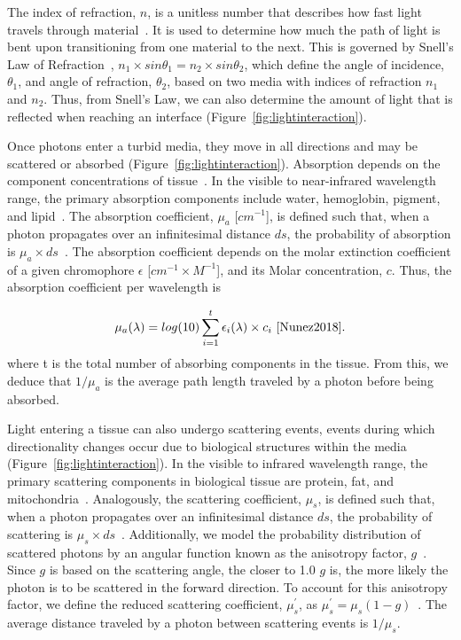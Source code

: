 The index of refraction, $n$, is a unitless number that describes how fast light travels through material~\cite{Wang2009}. It is used to determine how much the path of light is bent upon transitioning from one material to the next.  This is governed by Snell’s Law of Refraction~\cite{Wang2009}, $n_1 \times sin\theta_1= n_2\times sin\theta_2$, which define the angle of incidence, $\theta_1$, and angle of refraction, $\theta_2$, based on two media with indices of refraction $n_1$ and $n_2$. Thus, from Snell’s Law, we can also determine the amount of light that is reflected when reaching an interface (Figure~\ref{fig:lightinteraction}). 

Once photons enter a turbid media, they move in all directions and may be scattered or absorbed (Figure~\ref{fig:lightinteraction}). Absorption depends on the component concentrations of tissue~\cite{Nunez2018}. In the visible to near-infrared wavelength range, the primary absorption components include water, hemoglobin, pigment, and lipid~\cite{Du2006, Pogue2006}. The absorption coefficient, $\mu_a$ [$cm^{-1}$], is defined such that, when a photon propagates over an infinitesimal distance $ds$, the probability of absorption is $\mu_a\times ds$~\cite{Welch2010}. The absorption coefficient depends on the molar extinction coefficient of a given chromophore $\epsilon$ [$cm^{-1}\times M^{-1}$], and its Molar concentration, $c$. Thus, the absorption coefficient per wavelength is 

\begin{equation}
    \mu_a(\lambda) = log(10) \sum_{i=1}^{t}\epsilon_i(\lambda)\times c_i~\cite{Nunez2018}. 
\end{equation}
where t is the total number of absorbing components in the tissue. From this, we deduce that $1/\mu_a$ is the average path length traveled by a photon before being absorbed. 

Light entering a tissue can also undergo scattering events, events during which directionality changes occur due to biological structures within the media (Figure~\ref{fig:lightinteraction}). In the visible to infrared wavelength range, the primary scattering components in biological tissue are protein, fat, and mitochondria~\cite{Du2006, Pogue2006}. Analogously, the scattering coefficient, $\mu_s$, is defined such that, when a photon propagates over an infinitesimal distance $ds$, the probability of scattering is $\mu_s\times ds$~\cite{Welch2010}. Additionally, we model the probability distribution of scattered photons by an angular function known as the anisotropy factor, $g$~\cite{Wang2009}. Since $g$ is based on the scattering angle, the closer to 1.0 $g$ is, the more likely the photon is to be scattered in the forward direction. To account for this anisotropy factor, we define the reduced scattering coefficient, $\mu_s^{'}$, as 
$\mu_s^{'} = \mu_s(1-g)$~\cite{Wang2009}. The average distance traveled by a photon between scattering events is $1/\mu_s$.


